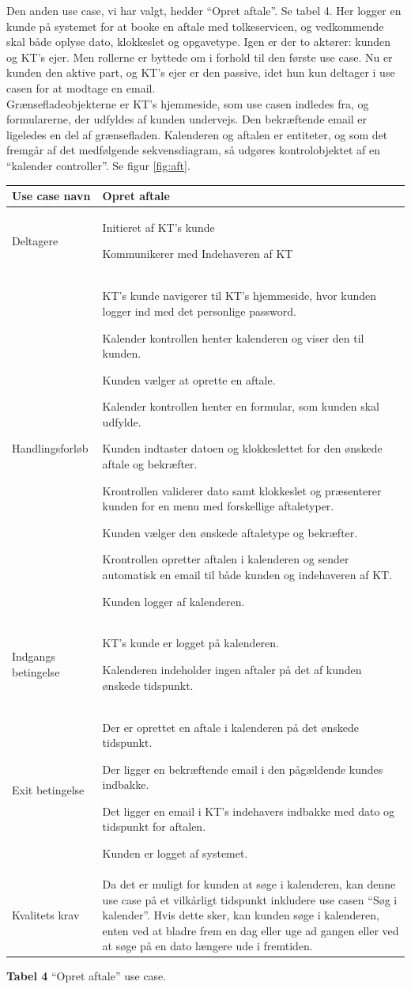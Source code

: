 \documentclass[12pt]{article}   %
\newcommand{\nextitem}{\par\hspace*{\labelsep}\textbullet\hspace*{\labelsep}}
\begin{document}
Den anden use case, vi har valgt, hedder ``Opret aftale''. Se tabel 4.  Her 
logger en kunde på systemet for at booke en aftale med tolkeservicen, og
vedkommende skal både oplyse dato, klokkeslet og opgavetype. Igen er der to
aktører: kunden og KT's ejer. Men rollerne er byttede om i forhold til den
første use case. Nu er kunden den aktive part, og KT's ejer er den passive,
idet hun kun deltager i use casen for at modtage en email.\\
Grænsefladeobjekterne er KT's hjemmeside, som use casen indledes fra, og
formularerne, der udfyldes af kunden undervejs. Den bekræftende email er
ligeledes en del af grænsefladen. Kalenderen og aftalen er entiteter, og som
det fremgår af det medfølgende sekvensdiagram, så udgøres kontrolobjektet af en
``kalender controller''. Se figur \ref{fig:aft}. 


\begin{tabular}{l p{10cm}}
Use case navn & Opret aftale \\ \hline
Deltagere & \nextitem Initieret af KT's kunde
            \nextitem Kommunikerer med Indehaveren af KT\\ \hline
Handlingsforløb &
	\nextitem KT's kunde navigerer til KT's hjemmeside, hvor kunden logger
	ind med det personlige password.
	\nextitem Kalender kontrollen henter kalenderen og viser den til
	kunden.
	\nextitem Kunden vælger at oprette en aftale.
	\nextitem Kalender kontrollen henter en formular, som kunden skal
	udfylde.
	\nextitem Kunden indtaster datoen og klokkeslettet for den ønskede 
	aftale og bekræfter.
	\nextitem Krontrollen validerer dato samt klokkeslet og præsenterer
	kunden for en menu med forskellige aftaletyper.
	\nextitem Kunden vælger den ønskede aftaletype og bekræfter.
	\nextitem Krontrollen opretter aftalen i kalenderen og sender
	automatisk en email til både kunden og indehaveren af KT. 
	\nextitem Kunden logger af kalenderen.
	\\ \hline
	Indgangs betingelse &
		\nextitem KT's kunde er logget på kalenderen. 
		\nextitem Kalenderen indeholder ingen aftaler på det af kunden
		ønskede tidspunkt.
		\\ \hline
Exit betingelse & 
	\nextitem Der er oprettet en aftale i kalenderen på det ønskede
	tidspunkt. 
		\nextitem Der ligger en bekræftende email i den pågældende kundes
			indbakke.
		\nextitem Det ligger en email i KT's indehavers
			indbakke med dato og tidspunkt for aftalen. 
		\nextitem Kunden er logget af systemet.\\ \hline
		Kvalitets krav & Da det er muligt for kunden at søge i
		kalenderen, kan denne use case på et vilkårligt tidspunkt
		inkludere use casen  ``Søg i kalender''. Hvis dette sker, kan
		kunden søge i kalenderen, enten ved at bladre frem en dag eller uge
		ad gangen eller ved at søge på en dato længere ude i
		fremtiden.\\ \hline
\end{tabular}
\begin{center}
\textbf{Tabel 4} ``Opret aftale'' use case.
\end{center}
\vspace{0.5cm}
\end{document}
